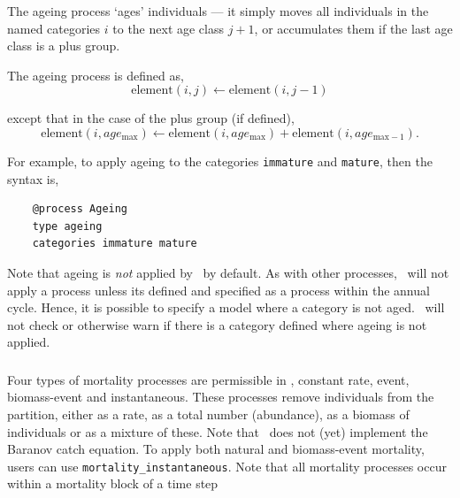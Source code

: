 \subsubsection{\label{sec:ageing}}

The ageing process `ages' individuals --- it simply moves all individuals in the named categories $i$ to the next age class $j + 1$, or accumulates them if the last age class is a plus group. 

The ageing process is defined as,
\begin{equation}
  \text{element}(i,j) \leftarrow \text{element}(i,j-1)
\end{equation}

except that in the case of the plus group (if defined), 
\begin{equation}
  \text{element}(i,age_{\text{max}}) \leftarrow \text{element}(i,age_{\text{max}}) + \text{element}(i,age_{\text{max}-1}).
\end{equation}

For example, to apply ageing to the categories \texttt{immature} and \texttt{mature}, then the syntax is,

{\small{\begin{verbatim}
	@process Ageing
	type ageing
	categories immature mature
	\end{verbatim}}}

Note that ageing is \emph{not} applied by \CNAME\ by default. As with other processes, \CNAME\ will not apply a process unless its defined and specified as a process within the annual cycle. Hence, it is possible to specify a model where a category is not aged. \CNAME\ will not check or otherwise warn if there is a category defined where ageing is not applied.

\subsubsection{\label{sec:mortality}}

Four types of mortality processes are permissible in \CNAME, constant rate, event, biomass-event and instantaneous. These processes remove individuals from the partition, either as a rate, as a total number (abundance), as a biomass of individuals or as a mixture of these. Note that \CNAME\ does not (yet) implement the Baranov catch equation. To apply both natural and biomass-event mortality, users can use \texttt{mortality\_instantaneous}. Note that all mortality processes occur within a mortality block of a time step


